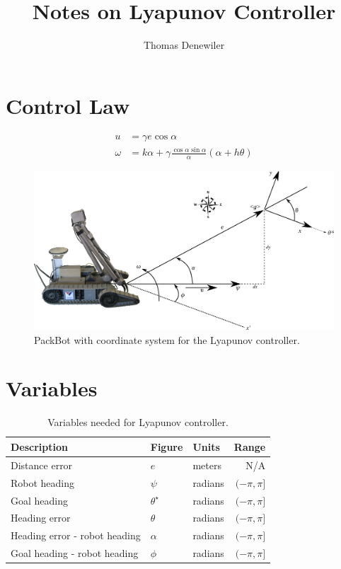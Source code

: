 \documentclass[12pt]{article}
\begin{document}
\title{Notes on Lyapunov Controller}
\author{Thomas Denewiler}
\maketitle

\section{Control Law}
\begin{align*}
u &= \gamma e\cos\alpha \\
\omega &= k\alpha + \gamma\frac{\cos\alpha\sin\alpha}{\alpha}\left(\alpha+h\theta\right)
\end{align*}

\begin{figure}[ht!]
	\centering
	\includegraphics[width=.95\textwidth]{images/packbotlyapunov}
	\caption{PackBot with coordinate system for the Lyapunov controller.}
	\label{fig:pblyapunov}
\end{figure}

\section{Variables}
\begin{table}[ht!]
\caption{Variables needed for Lyapunov controller.}
\small
\centering
\begin{tabular}{@{}lllr@{}} \toprule
Description                   & Figure         & Units   & Range \\ \midrule
Distance error                & $e$            & meters  & N/A \\
Robot heading                 & $\psi$         & radians & $(-\pi,\pi]$ \\
Goal heading                  & $\theta^\star$ & radians & $(-\pi,\pi]$ \\
Heading error                 & $\theta$       & radians & $(-\pi,\pi]$ \\
Heading error - robot heading & $\alpha$       & radians & $(-\pi,\pi]$ \\
Goal heading - robot heading  & $\phi$         & radians & $(-\pi,\pi]$ \\ \bottomrule
\end{tabular}
\label{tab:LyapunovVariables}
\end{table}
\end{document}
